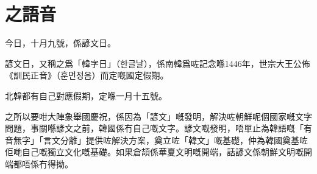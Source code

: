 \documentclass[a5paper, 10pt, openany]{book} %
\begin{document}



\chapter{之語音}


今日，十月九號，係諺文日。

諺文日，又稱之爲「韓字日」（{\koreanfont 한글날}），係南韓爲咗記念喺1446年，世宗大王公佈《訓民正音》（{\koreanfont 훈먼정음}）而定嘅國定假期。

北韓都有自己對應假期，定喺一月十五號。

之所以要咁大陣象舉國慶祝，係因為「諺文」嘅發明，解決咗朝鮮呢個國家嘅文字問題，事關喺諺文之前，韓國係冇自己嘅文字。諺文嘅發明，唔單止為韓語嘅「有音無字」「言文分離」提供咗解決方案，奠立咗「韓文」嘅基礎，仲為韓國奠基咗佢哋自己嘅獨立文化嘅基礎。如果倉頡係華夏文明嘅開端，話諺文係朝鮮文明嘅開端都唔係冇得拗。
\end{document}
